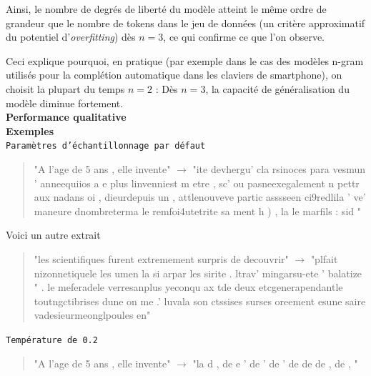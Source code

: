 Ainsi, le nombre de degrés de liberté du modèle atteint le même ordre
de grandeur que le nombre de tokens dans le jeu de données (un critère 
approximatif du potentiel d'\emph{overfitting}) dès \(n=3\), ce qui 
confirme ce que l'on observe.

Ceci explique pourquoi, en pratique (par exemple dans le cas des modèles
n-gram utilisés pour la complétion automatique dans les claviers de
smartphone), on choisit la plupart du temps \(n=2\) : Dès \(n=3\), la
capacité de généralisation du modèle diminue fortement. \\


\noindent{}\textbf{Performance qualitative} \\

\textbf{Exemples} \\


\noindent{} \texttt{Paramètres d'échantillonnage par défaut}

  \begin{quotation}
  "A l'age de 5 ans , elle invente" $\rightarrow$ "ite devhergu' cla rsinoces para vesmun ' anneequiios a e plus linvenniest m etre  , sc' ou pasneexegalement n pettr aux nadans oi , dieurdepuis un  , attlenouveve partic asssseen ci9redlila ' ve' maneure dnombreterma le remfoi4utetrite sa ment h ) , la le marfils : sid "
  \end{quotation}


Voici un autre extrait

  \begin{quotation}
  "les scientifiques furent extremement surpris de decouvrir" $\rightarrow$ "plfait nizonnetiquele les  umen la si arpar les sirite  . ltrav' mingarsu-ete ' balatize  " . le meferadele verresanplus yeconqu ax tde deux  etcgenerapendantle toutngctibrises dune on me  .' luvala son ctssises surses oreement esune saire vadesieurmeonglpoules en"
  \end{quotation}


\noindent{} \texttt{Température de 0.2}

  \begin{quotation}
    
    "A l'age de 5 ans , elle invente" $\rightarrow$ "la d  \hspace{0.3cm},  \hspace{0.3cm}  de   \hspace{0.3cm}  e  \hspace{3cm}                ' de   \hspace{0.6cm}  ' de \hspace{2.7cm}              ' de    \hspace{2cm}     de  \hspace{0.6cm}   de \hspace{0.6cm}   ,  \hspace{0.5cm}         de \hspace{0.3cm}     , \hspace{0.8cm}             "
  \end{quotation}



